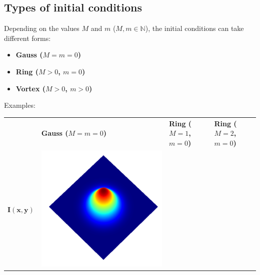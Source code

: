 \documentclass[a4paper, 12pt]{article}
\begin{document}
\subsection{Types of initial conditions}

Depending on the values $M$ and $m$ ($M, m \in \mathbb{N}$), the initial conditions can take different forms:
\begin{itemize}
\item \textbf{Gauss ($M=m=0$)} 
\item \textbf{Ring ($M>0$, $m=0$)} 
\item \textbf{Vortex ($M>0$, $m>0$)}
\end{itemize}
Examples:
\begin{center}
\begin{tabular}{M{1.5cm}M{5cm}M{5cm}M{5cm}}
\ & \textbf{Gauss ($M=m=0$)} & \textbf{Ring ($M=1$, $m=0$)} & \textbf{Ring ($M=2$, $m=0$)} \\
 $\mathbf{I(x,y)}$ &
\includegraphics[width=\linewidth]{../resources/math_model/intensity_M=0.png} & 

\end{tabular}
\end{center}
\end{document}
